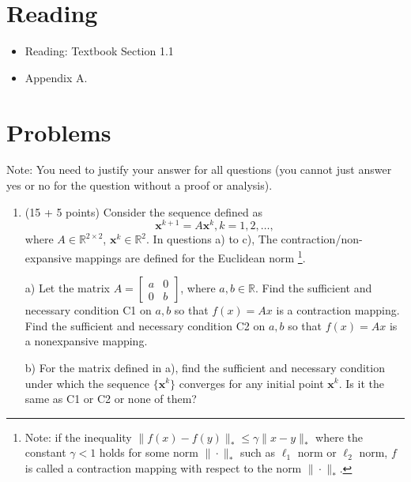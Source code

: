 \documentclass[11pt,letterpaper]{article}
\begin{document}
\section{Reading} 
\begin{itemize}
\item Reading: Textbook Section 1.1
\item Appendix A. 
\end{itemize}


\section{Problems}

Note: You need to justify your answer for all questions (you cannot just answer yes or no for the question
without a proof or analysis).

\begin{enumerate}
\item (15 + 5 points) Consider the sequence defined as 
$$
 \mathbf{x}^{k+1} = A \mathbf{x}^k, k =1, 2, \dots,
$$	
where $A \in \mathbb{R}^{2 \times 2}$, $ \mathbf{x}^k \in \mathbb{R}^2 $.
In questions a) to c), The contraction/non-expansive mappings are defined for the Euclidean norm
\footnote{Note: if the inequality $ \| f(x) - f(y) \|_{ * } \leq \gamma \| x - y\|_* $ where the constant $\gamma < 1 $ holds for some norm $\| \cdot\|_*$ such as $\ell_1$ norm or $\ell_2$ norm, $f$ is  called a contraction mapping with respect to the norm $\| \cdot \|_*$.}. 

a) Let the matrix $A = \begin{bmatrix}
  a  & 0  \\ 
0    & b
\end{bmatrix}$, where $a, b \in \mathbb{R} . $
Find the sufficient and necessary condition C1 on $a, b$ so that $f(x) = A x$ is a contraction mapping. 
Find the sufficient and  necessary condition C2 on $a, b$
so that $f(x) = Ax $ is a nonexpansive mapping. 

b) For the matrix defined in a), find the sufficient and necessary condition under which the sequence $\{ \mathbf{x}^k \} $  converges for any initial point $\mathbf{x}^k$. 
Is it the same as C1 or C2 or none of them? 


\end{enumerate}
\end{document}
